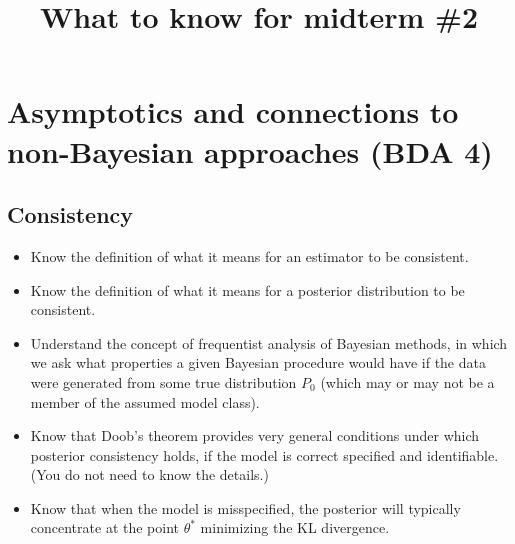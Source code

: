 \documentclass[12pt]{article}
\title{What to know for midterm \#2}
\author{}
\date{}
\begin{document}
\maketitle

\section{Asymptotics and connections to non-Bayesian approaches (BDA 4)}

\subsection{Consistency}
\begin{itemize}
\item Know the definition of what it means for an estimator to be consistent.
\item Know the definition of what it means for a posterior distribution to be consistent.
\item Understand the concept of frequentist analysis of Bayesian methods, in which we ask what properties a given Bayesian procedure would have if the data were generated from some true distribution $P_0$ (which may or may not be a member of the assumed model class).
\item Know that Doob's theorem provides very general conditions under which posterior consistency holds, if the model is correct specified and identifiable. (You do not need to know the details.)
\item Know that when the model is misspecified, the posterior will typically concentrate at the point $\theta^*$ minimizing the KL divergence. 
\end{itemize}
\end{document}
